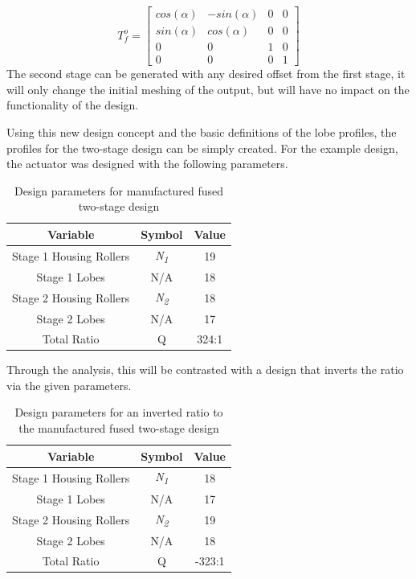 \begin{equation} \label{eq:T_fo}
T_f^o = \left[{\begin{array}{cccc}
		cos(\alpha) & -sin(\alpha) & 0 & 0\\
		sin(\alpha) & cos(\alpha) & 0 & 0\\
		0 & 0 & 1 & 0\\
		0 & 0 & 0 & 1 \end{array} } \right]
\end{equation}
The second stage can be generated with any desired offset from the first stage, it will only change the initial meshing of the output, but will have no impact on the functionality of the design. 

Using this new design concept and the basic definitions of the lobe profiles, the profiles for the two-stage design can be simply created. For the example design, the actuator was designed with the following parameters. 
\begin{table}[h]
  \vskip0.2cm
  \caption{Design parameters for manufactured fused two-stage design}
  \label{table:two_stage_design_params}
  \begin{center}
    \vskip-0.2cm
	\begin{tabular}{|c|c|c|}
		\hline
		Variable & Symbol & Value\\
		\hline
		Stage 1 Housing Rollers & \textit{N\textsubscript{1}} & 19\\
		\hline
		Stage 1 Lobes & N/A & 18\\
		\hline
		Stage 2 Housing Rollers & \textit{N\textsubscript{2}} & 18\\
		\hline
		Stage 2 Lobes & N/A & 17\\
		\hline
		Total Ratio & Q & 324:1 \\
		\hline
	\end{tabular}
  \end{center}
\end{table}

Through the analysis, this will be contrasted with a design that inverts the ratio via the given parameters. 

\begin{table}[h]
  \vskip0.2cm
  \caption{Design parameters for an inverted ratio to the manufactured fused two-stage design}
  \label{table:two_stage_invert_design_params}
  \begin{center}
    \vskip-0.2cm
	\begin{tabular}{|c|c|c|}
		\hline
		Variable & Symbol & Value\\
		\hline
		Stage 1 Housing Rollers & \textit{N\textsubscript{1}} & 18\\
		\hline
		Stage 1 Lobes & N/A & 17\\
		\hline
		Stage 2 Housing Rollers & \textit{N\textsubscript{2}} & 19\\
		\hline
		Stage 2 Lobes & N/A & 18\\
		\hline
		Total Ratio & Q & -323:1 \\
		\hline
	\end{tabular}
  \end{center}
\end{table}



